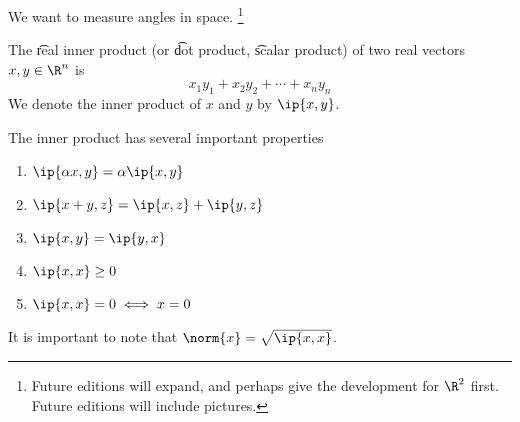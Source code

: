 
We want to measure angles in space.
  \ifhmode\unskip\fi\footnote{
Future editions will expand, and perhaps give the development for $\R^2$ first.
Future editions will include pictures.
  }

The \t{real inner product} (or \t{dot product}, \t{scalar product}) of two real vectors $x, y \in \R^n$ is
  \[
x_1y_1 + x_2y_2 + \cdots + x_ny_n
  \]
We denote the inner product of $x$ and $y$ by $\ip{x,y}$.

The inner product has several important properties
  \begin{enumerate}
  \item $\ip{\alpha x, y} = \alpha\ip{x, y}$
  \item $\ip{x + y, z} = \ip{x, z} + \ip{y, z}$
  \item $\ip{x, y} = \ip{y, x}$
  \item $\ip{x,x} \geq 0$
  \item $\ip{x,x} = 0 \iff x = 0$
  \end{enumerate}

It is important to note that $\norm{x} = \sqrt{\ip{x,x}}$.

\blankpage
